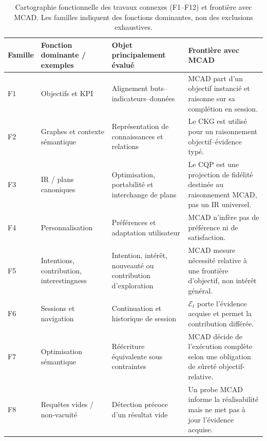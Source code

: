 \begin{table}[!t]
\caption{Cartographie fonctionnelle des travaux connexes (F1--F12) et frontière avec MCAD. Les familles indiquent des fonctions dominantes, non des exclusions exhaustives.}
\label{tab:related-work-landscape-post-a8}
\centering
\scriptsize
\begin{tabularx}{\textwidth}{p{} p{} X X}
\toprule
\textbf{Famille} & \textbf{Fonction dominante / exemples} & \textbf{Objet principalement évalué} & \textbf{Frontière avec MCAD} \\
\midrule
F1 & Objectifs et KPI~\cite{Pourshahid2014,MateTrujilloMylopoulos2017,DiamantiniKPISurvey2025} & Alignement buts--indicateurs--données & MCAD part d'un objectif instancié et raisonne sur sa complétion en session. \\
F2 & Graphes et contexte sémantique~\cite{HoganKGSurvey2021,SchuetzSerafiniBozzato2021,StaudingerSchuetzSchrefl2025,HuangZaslavsky2024} & Représentation de connaissances et relations & Le CKG est utilisé pour un raisonnement objectif--évidence typé. \\
F3 & IR / plans canoniques~\cite{BegoliCalcite2018,SubstraitSpec2026} & Optimisation, portabilité et interchange de plans & Le CQP est une projection de fidélité destinée au raisonnement MCAD, pas un IR universel. \\
F4 & Personnalisation~\cite{GolfarelliRizziBiondi2011} & Préférences et adaptation utilisateur & MCAD n'infère pas de préférence ni de satisfaction. \\
F5 & Intentions, contribution, interestingness~\cite{VassiliadisMarcelRizzi2019,DjedainiEtAl2019,GkitsakisEtAl2024,FranciaPredict2026,IakovidisVassiliadis2026} & Intention, intérêt, nouveauté ou contribution d'exploration & MCAD mesure nécessité relative à une frontière d'objectif, non intérêt général. \\
F6 & Sessions et navigation~\cite{AligonDSS2015,DjedainiEtAl2019,IakovidisVassiliadis2026} & Continuation et historique de session & $\mathcal{E}_t$ porte l'évidence acquise et permet la contribution différée. \\
F7 & Optimisation sémantique~\cite{BertinoMusto1992,KossmannPapenbrockNaumann2022} & Réécriture équivalente sous contraintes & MCAD décide de l'exécution complète selon une obligation de sûreté objectif-relative. \\
F8 & Requêtes vides / non-vacuité~\cite{LuoEmptyResult2006} & Détection précoce d'un résultat vide & Un probe MCAD informe la réalisabilité mais ne met pas à jour l'évidence acquise. \\

\end{tabularx}
\end{table}
